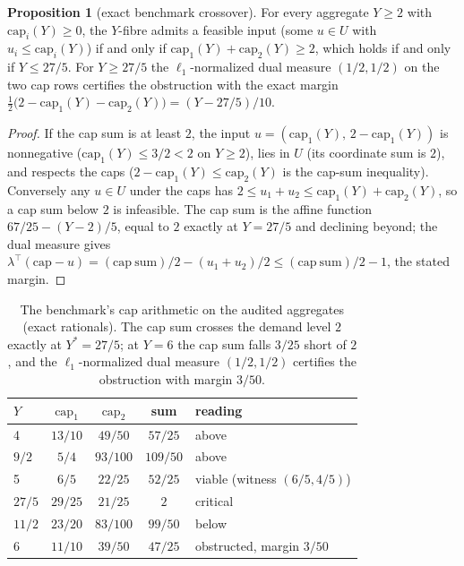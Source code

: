 \documentclass[10pt,twocolumn]{article}
\theoremstyle{definition}
\newtheorem{proposition}{Proposition}
\begin{document}
\begin{proposition}[exact benchmark crossover]\label{prop:bench}
For every aggregate \(Y \ge 2\) with \(\mathrm{cap}_i(Y) \ge 0\), the
\(Y\)-fibre admits a feasible input (some \(u \in U\) with
\(u_i \le \mathrm{cap}_i(Y)\)) if and only if
\(\mathrm{cap}_1(Y) + \mathrm{cap}_2(Y) \ge 2\), which holds if and
only if \(Y \le 27/5\). For \(Y \ge 27/5\) the
\(\ell_1\)-normalized dual measure \((1/2, 1/2)\) on the two cap rows
certifies the obstruction with the exact margin
\(\tfrac12\bigl(2 - \mathrm{cap}_1(Y) - \mathrm{cap}_2(Y)\bigr) =
(Y - 27/5)/10\).
\end{proposition}

\begin{proof}
If the cap sum is at least \(2\), the input
\(u = (\mathrm{cap}_1(Y),\, 2 - \mathrm{cap}_1(Y))\) is nonnegative
(\(\mathrm{cap}_1(Y) \le 3/2 < 2\) on \(Y \ge 2\)), lies in
\(U\) (its coordinate sum is \(2\)), and respects the caps
(\(2 - \mathrm{cap}_1(Y) \le \mathrm{cap}_2(Y)\) is the cap-sum
inequality). Conversely any \(u \in U\) under the caps has
\(2 \le u_1 + u_2 \le \mathrm{cap}_1(Y) + \mathrm{cap}_2(Y)\), so a
cap sum below \(2\) is infeasible. The cap sum is the affine function
\(67/25 - (Y - 2)/5\), equal to \(2\) exactly at \(Y = 27/5\) and
declining beyond; the dual measure gives
\(\lambda^\top(\mathrm{cap} - u) = (\mathrm{cap\ sum})/2 -
(u_1 + u_2)/2 \le (\mathrm{cap\ sum})/2 - 1\), the stated margin.
\end{proof}

\begin{table}[t]
\centering
\footnotesize
\caption{The benchmark's cap arithmetic on the audited aggregates
(exact rationals). The cap sum crosses the demand level \(2\) exactly
at \(Y^{*} = 27/5\); at \(Y = 6\) the cap sum falls \(3/25\) short of
\(2\), and the \(\ell_1\)-normalized dual measure \((1/2, 1/2)\) certifies the
obstruction with margin \(3/50\).}
\label{tab:bench}
\begin{tabular}{@{}l c c c l@{}}
\toprule
\(Y\) & \(\mathrm{cap}_1\) & \(\mathrm{cap}_2\) & sum & reading\\
\midrule
4 & $13/10$ & $49/50$ & $57/25$ & above\\
$9/2$ & $5/4$ & $93/100$ & $109/50$ & above\\
5 & $6/5$ & $22/25$ & $52/25$ & viable (witness $(6/5, 4/5)$)\\
$27/5$ & $29/25$ & $21/25$ & $2$ & critical\\
$11/2$ & $23/20$ & $83/100$ & $99/50$ & below\\
6 & $11/10$ & $39/50$ & $47/25$ & obstructed, margin $3/50$\\
\bottomrule
\end{tabular}
\end{table}
\end{document}
